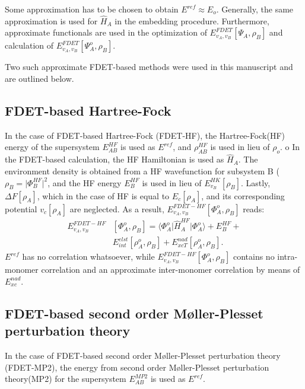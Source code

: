 \documentclass[journal=jctcce,manuscript=article, layout=twocolumn]{achemso}
\begin{document}
Some approximation has to be chosen to obtain $E^{ref} \approx E_o$. Generally, the same approximation is used for $\hat{H}_A$ in the embedding procedure.
Furthermore, approximate functionals are used in the optimization of $E_{v_A,v_B}^{FDET}[\Psi_{A},\rho_B]$ and calculation of $E_{v_A,v_B}^{FDET}[\Psi_{A}^{o},\rho_B]$.

Two such approximate FDET-based methods were used in this manuscript and are outlined below.
\subsection{FDET-based Hartree-Fock}
 In the case of FDET-based Hartree-Fock (FDET-HF), the Hartree-Fock(HF) energy of the supersystem $E^{HF}_{AB}$ is used as $E^{ref}$, and $\rho^{HF}_{AB}$ is used in lieu of $\rho_o$.
o In the FDET-based calculation, the HF Hamiltonian is used as $\hat{H}_A$. The environment density is obtained from a HF wavefunction for subsystem B ($\rho_B = \vert \Phi_B^{HF} \vert^2$, and the HF energy $E_B^{HF}$ is used in lieu of $E^{HK}_{v_B}[\rho_B]$. Lastly, $\Delta F[\rho_A]$, which in the case of HF is equal to $E_c[\rho_A]$, and its corresponding potential $v_c[\rho_A]$ are neglected.
 As a result, $E_{v_A,v_B}^{FDET-HF}[\Phi_{A}^{o},\rho_B]$ reads:
 \begin{align} \label{eq:E_FDET_HF}
  E_{v_A,v_B}^{FDET-HF} & [\Phi_{A}^{o},\rho_B] = \langle\Phi^{o}_{A}\vert \hat{H}^{HF}_A\vert \Phi^{o}_{A}\rangle + E^{HF}_B + \\ \nonumber
& E^{elst}_{int}[\rho^{o}_A,\rho_B] + E_{xcT}^{nad}[\rho^{o}_A,\rho_B].
 \end{align}
 $E^{ref}$ has no correlation whatsoever, while $E_{v_A,v_B}^{FDET-HF}[\Phi_{A}^{o},\rho_B]$ contains no intra-monomer correlation and an approximate inter-monomer correlation by means of $E_{xc}^{nad}$. 
 
\subsection{FDET-based second order M{\o}ller-Plesset perturbation theory} \label{sect:FDET_MP2}
In the case of FDET-based second order M{\o}ller-Plesset perturbation theory (FDET-MP2), the energy from second order M{\o}ller-Plesset perturbation theory(MP2) for the supersystem $E^{MP2}_{AB}$ is used as $E^{ref}$.
\end{document}

